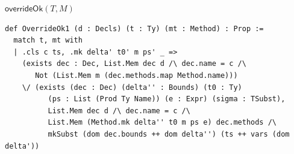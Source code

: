 \begin{cmp}{$\mathsf{overrideOk}(T,M)$}
\begin{paperside}
\end{paperside}
\begin{leanside}
\begin{lstlisting}[style=leanside]
def OverrideOk1 (d : Decls) (t : Ty) (mt : Method) : Prop :=
  match t, mt with
  | .cls c ts, .mk delta' t0' m ps' _ =>
    (exists dec : Dec, List.Mem dec d /\ dec.name = c /\
       Not (List.Mem m (dec.methods.map Method.name)))
    \/ (exists (dec : Dec) (delta'' : Bounds) (t0 : Ty)
          (ps : List (Prod Ty Name)) (e : Expr) (sigma : TSubst),
          List.Mem dec d /\ dec.name = c /\
          List.Mem (Method.mk delta'' t0 m ps e) dec.methods /\
          mkSubst (dom dec.bounds ++ dom delta'') (ts ++ vars (dom delta'))

\end{lstlisting}
\end{leanside}
\end{cmp}
